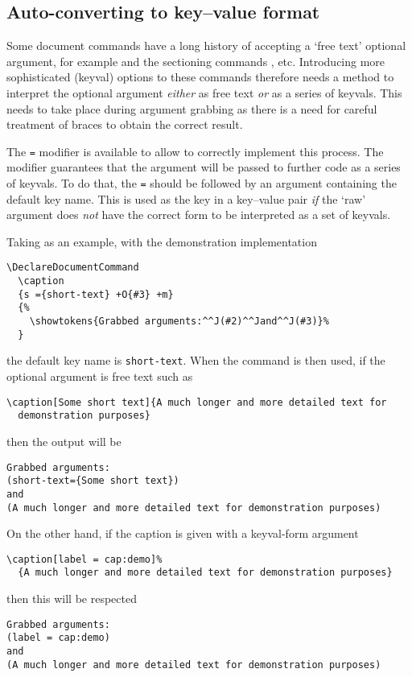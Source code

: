 \documentclass{ltxguide}
\begin{document}
\subsection{Auto-converting to key--value format}
\label{sec:cmd:keyval}

Some document commands have a long history of accepting a `free text' optional
argument, for example  and the sectioning commands ,
etc. Introducing more sophisticated (keyval) options to these commands
therefore needs a method to interpret the optional argument \emph{either} as
free text \emph{or} as a series of keyvals. This needs to take place
during argument grabbing as there is a need for careful treatment of
braces to obtain the correct result.

The \texttt{=} modifier is available to allow  to correctly
implement this process. The modifier guarantees that the argument will be
passed to further code as a series of keyvals. To do that, the \texttt{=}
should be followed by an argument containing the default key name. This is used
as the key in a key--value pair \emph{if} the `raw' argument does \emph{not}
have the correct form to be interpreted as a set of keyvals.

Taking  as an example, with the demonstration implementation
\begin{verbatim}
\DeclareDocumentCommand
  \caption
  {s ={short-text} +O{#3} +m}
  {%
    \showtokens{Grabbed arguments:^^J(#2)^^Jand^^J(#3)}%
  }
\end{verbatim}
the default key name is \texttt{short-text}. When the command  is
then used, if the optional argument is free text such as
\begin{verbatim}
\caption[Some short text]{A much longer and more detailed text for
  demonstration purposes}
\end{verbatim}
then the output will be
\begin{verbatim}
Grabbed arguments:
(short-text={Some short text})
and
(A much longer and more detailed text for demonstration purposes)
\end{verbatim}
On the other hand, if the caption is given with a keyval-form argument
\begin{verbatim}
\caption[label = cap:demo]%
  {A much longer and more detailed text for demonstration purposes}
\end{verbatim}
then this will be respected
\begin{verbatim}
Grabbed arguments:
(label = cap:demo)
and
(A much longer and more detailed text for demonstration purposes)
\end{verbatim}
\end{document}
